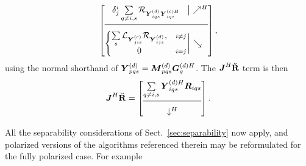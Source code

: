 \documentclass[useAMS,usenatbib]{mn2e}
\makeatletter
\newcommand{\mat}[1]{{\bmath{#1}}}
\newcommand{\JJ}{\mat{J}} %
\newcommand{\RR}{\mat{R}}
\newcommand{\Matrix}[2]{\left [ \begin{array}{@{}#1@{}}#2\end{array} \right ]}
\newcommand{\AUGx}[1]{\mathbf{\breve{#1}}}
\newcommand{\RRr}{\AUGx{R}}
\newcommand{\Rop}[1]{\mathcal{R}_{{#1}}}
\newcommand{\Lop}[1]{\mathcal{L}_{{#1}}}
\numberwithin{equation}{section} %
\providecommand{\DIFadd}[1]{{\protect\color{blue}\uwave{#1}}} %
\providecommand{\DIFaddbegin}{} %
\providecommand{\DIFaddend}{} %
\providecommand{\DIFdelbegin}{} %
\providecommand{\DIFdelend}{} %
\makeatother
\begin{document}


\begin{equation}%
\DIFdelend \DIFaddbegin \JHJblocks{
  \delta^i_j \sum\limits_{q\ne i,s} \Rop{\YYd_{iqs} \YYcH_{iqs}} 
  }{
  \left \{ 
  \begin{array}{@{}cc@{}}
   \sum\limits_{s} \Lop{ \YYc_{jis}  } \Rop{\YYd_{ijs}},&{\scriptstyle i\ne j} \\
   0 &{\scriptstyle i=j}
  \end{array} \right . 
  }
,
\end{equation}
using the normal shorthand of $\YYd_{pqs} = \MMd_{pqs} \GGdH_q$. The $\JJ^H\RRr$ term is then
\newcommand{\CCC}{\mathcal{C}}
\begin{equation}
\label{eq:JHR:DD:pol}
\JJ^H\RRr = \Matrix{c}{
\sum\limits_{q\ne i,s} \YYdH_{iqs} \RR_{iqs} \\
\hline\\[-8pt]
\downarrow^H}.
\DIFaddend \end{equation}
\DIFdelbegin %

\DIFdelend All the separability considerations of Sect.~\ref{sec:separability} now apply, and polarized versions of the 
algorithms referenced therein may be reformulated for the fully polarized case. For example\DIFaddbegin \DIFadd{:
}\DIFaddend 
\end{document}
